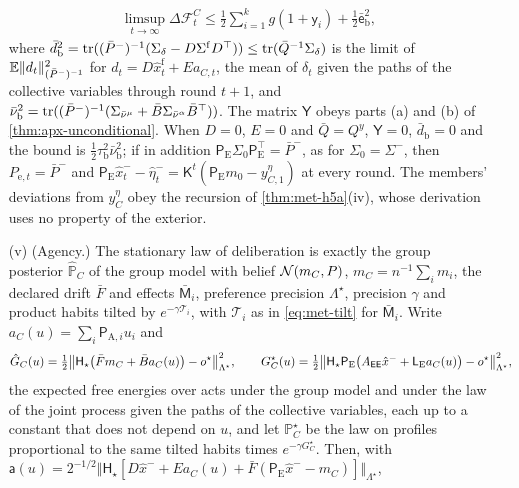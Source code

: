 \begin{theorem}
\begin{enumerate}
\begin{equation}
\begin{gathered}
\limsup_{t\to\infty}\Delta\mathcal F^C_t\le\frac12\sum_{i=1}^kg(1+\mathsf y_i)+\frac12\bar{\mathsf e}_{\mathrm b}^2,
\end{gathered}
\end{equation}
where $\bar d_{\mathrm b}^2=\tr((\bar P^-)^{-1}(\Sigma_\delta-D\Sigma^{\mathrm f}D^\top))\le\tr(\bar Q^{-1}\Sigma_\delta)$ is the limit of $\E\Vert d_t\Vert^2_{(\bar P^-)^{-1}}$ for $d_t=D\hat x^{\mathrm f}_t+Ea_{C,t}$, the mean of $\delta_t$ given the paths of the collective variables through round $t+1$, and $\bar\nu_{\mathrm b}^2=\tr((\bar P^-)^{-1}(\Sigma_{\bar\nu^\mu}+\bar B\Sigma_{\bar\nu^\alpha}\bar B^\top))$. The matrix $\mathsf Y$ obeys parts (a) and (b) of \cref{thm:apx-unconditional}. When $D=0$, $E=0$ and $\bar Q=Q^y$, $\mathsf Y=0$, $\bar d_{\mathrm b}=0$ and the bound is $\frac12\tau_{\mathrm b}^2\bar\nu_{\mathrm b}^2$; if in addition $\mathsf P_{\mathrm E}\Sigma_0\mathsf P_{\mathrm E}^\top=\bar P^-$, as for $\Sigma_0=\Sigma^-$, then $P_{\mathrm e,t}=\bar P^-$ and $\mathsf P_{\mathrm E}\hat x^-_t-\hat\eta^-_t=\mathsf K^t(\mathsf P_{\mathrm E}m_0-y^\eta_{C,1})$ at every round. The members' deviations from $y^\eta_C$ obey the recursion of \cref{thm:met-h5a}(iv), whose derivation uses no property of the exterior.
\item[(v)] (Agency.) The stationary law of deliberation is exactly the group posterior $\hat{\mathbb P}_C$ of the group model with belief $\mathcal{N}(m_C,P)$, $m_C=n^{-1}\sum_im_i$, the declared drift $\bar F$ and effects $\bar{\mathsf M}_i$, preference precision $\Lambda^\star$, precision $\gamma$ and product habits tilted by $e^{-\gamma\mathcal T_i}$, with $\mathcal T_i$ as in \eqref{eq:met-tilt} for $\bar{\mathsf M}_i$. Write $a_C(u)=\sum_i\mathsf P_{\mathrm A,i}u_i$ and
\begin{equation*}
\hat G_C(u)=\tfrac12\bigl\Vert\mathsf H_\star\bigl(\bar Fm_C+\bar Ba_C(u)\bigr)-o^\star\bigr\Vert^2_{\Lambda^\star},\qquad G^\star_C(u)=\tfrac12\bigl\Vert\mathsf H_\star\mathsf P_{\mathrm E}\bigl(A_{\mathsf{E}\mathsf{E}}\hat x^-+\mathsf L_{\mathrm E}a_C(u)\bigr)-o^\star\bigr\Vert^2_{\Lambda^\star},
\end{equation*}
the expected free energies over acts under the group model and under the law of the joint process given the paths of the collective variables, each up to a constant that does not depend on $u$, and let $\mathbb P^\star_C$ be the law on profiles proportional to the same tilted habits times $e^{-\gamma G^\star_C}$. Then, with $\mathsf a(u)=2^{-1/2}\Vert\mathsf H_\star[D\hat x^-+Ea_C(u)+\bar F(\mathsf P_{\mathrm E}\hat x^--m_C)]\Vert_{\Lambda^\star}$,

\end{enumerate}
\end{theorem}
